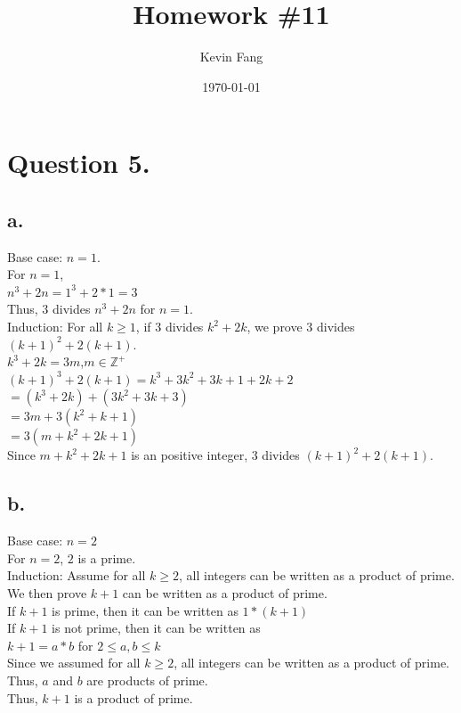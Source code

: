 \documentclass[titlepage]{article}\pagestyle{empty}
\author{Kevin Fang}
\title{Homework \#11}
\date{\today}
\begin{document}
\maketitle

\pagebreak
\section*{Question 5.}
\subsection*{a.}
Base case: $n=1$.\\
For $n=1$,\\
$n^3+2n=1^3+2*1=3$\\
Thus, $3$ divides $n^3+2n$ for $n=1$.\\
Induction: For all $k \geq 1$, if $3$ divides $k^2 + 2k$, we prove 3 divides $(k+1)^2+2(k+1)$.\\
$k^3+2k=3m$,$m \in \mathbb{Z}^+$\\
$(k+1)^3+2(k+1)=k^3+3k^2+3k+1+2k+2$\\
$=(k^3+2k)+(3k^2+3k+3)$\\
$=3m+3(k^2+k+1)$\\
$=3(m+k^2+2k+1)$\\
Since $m+k^2+2k+1$ is an positive integer, 3 divides $(k+1)^2+2(k+1)$.\\

\subsection*{b.}
Base case: $n=2$\\
For $n=2$, $2$ is a prime.\\
Induction: Assume for all $k \geq 2$, all integers can be written as a product of prime.\\
We then prove $k+1$ can be written as a product of prime.\\
If $k+1$ is prime, then it can be written as $1*(k+1)$\\
If $k+1$ is not prime, then it can be written as\\
$k+1=a*b$ for $2 \leq a, b \leq k$\\
Since we assumed for all $k \geq 2$, all integers can be written as a product of prime.\\
Thus, $a$ and $b$ are products of prime.\\
Thus, $k+1$ is a product of prime.\\

\pagebreak
\end{document}
